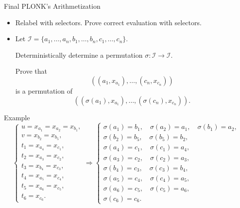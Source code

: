 \documentclass{beamer}
\newcommand{\wireindices}{\mathcal{I}}
\begin{document}
	\begin{frame}{Final PLONK's Arithmetization}
		\begin{itemize}
			\item Relabel with selectors. Prove correct evaluation with selectors.
			\item Let $\wireindices = \{a_1, \dots, a_n, b_1, \dots, b_n, c_1, \dots, c_n\}$. 
			
			Deterministically determine a permutation $\sigma : \wireindices \to \wireindices$. 
			
			Prove that
			\begin{equation*}
				\left((a_1, x_{a_1}), \dots, (c_n, x_{c_n})\right)
			\end{equation*}
			is a permutation of 
			\begin{equation*}
				\left((\sigma(a_1), x_{a_1}), \dots, (\sigma(c_n), x_{c_n})\right).
			\end{equation*}
		\end{itemize}
	\end{frame}
	\begin{frame}{Example}
		$$\begin{cases}
				u = x_{a_1} = x_{a_2} = x_{b_1},\\
				v = x_{b_2} = x_{b_5},\\
				t_1 = x_{a_4} = x_{c_1},\\
				t_2 = x_{a_3} = x_{c_2},\\
				t_3 = x_{b_4} = x_{c_3},\\
				t_4 = x_{a_5} = x_{c_4},\\
				t_5 = x_{a_6} = x_{c_5},\\
				t_6 = x_{c_6}.
			\end{cases} \Rightarrow \begin{cases}
				\sigma(a_1) = b_1,\quad \sigma(a_2) = a_1, \quad\sigma(b_1) = a_2,\\
				\sigma(b_2) = b_5, \quad \sigma(b_5) = b_2,\\
				\sigma(a_4) = c_1, \quad\sigma(c_1) = a_4,\\
				\sigma(a_3) = c_2, \quad\sigma(c_2) = a_3,\\
				\sigma(b_4) = c_3, \quad\sigma(c_3) = b_4,\\
				\sigma(a_5) = c_4, \quad\sigma(c_4) = a_5,\\
				\sigma(a_6) = c_5, \quad\sigma(c_5) = a_6,\\
				\sigma(c_6) = c_6.
			\end{cases}$$
	\end{frame}
\end{document}
